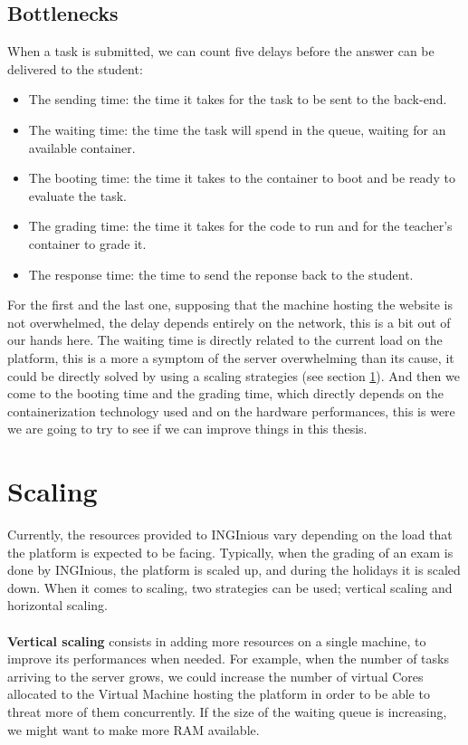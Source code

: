 \subsection{Bottlenecks}
When a task is submitted, we can count five delays before the answer can be delivered to the student:
\begin{itemize}
  \item The sending time: the time it takes for the task to be sent to the back-end.
  \item The waiting time: the time the task will spend in the queue, waiting for an available container.
  \item The booting time: the time it takes to the container to boot and be ready to evaluate the task.
  \item The grading time: the time it takes for the code to run and for the teacher's container to grade it.
  \item The response time: the time to send the reponse back to the student.
\end{itemize}
For the first and the last one, supposing that the machine hosting the website is not overwhelmed, the delay depends entirely on the network, this is a bit out of our hands here.  The waiting time is directly related to the current load on the platform, this is a more a symptom of the server overwhelming than its cause, it could be directly solved by using a scaling strategies (see section \ref{section:scaling}).  And then we come to the booting time and the grading time, which directly depends on the containerization technology used and on the hardware performances, this is were we are going to try to see if we can improve things in this thesis.

\section{Scaling} \label{section:scaling}
Currently, the resources provided to INGInious vary depending on the load that the platform is expected to be facing.  Typically, when the grading of an exam is done by INGInious, the platform is scaled up, and during the holidays it is scaled down.  When it comes to scaling, two strategies can be used; vertical scaling and horizontal scaling.

\paragraph{} \textbf{Vertical scaling} consists in adding more resources on a single machine, to improve its performances when needed.  For example, when the number of tasks arriving to the server grows, we could increase the number of virtual Cores allocated to the Virtual Machine hosting the platform in order to be able to threat more of them concurrently.  If the size of the waiting queue is increasing, we might want to make more RAM available.

